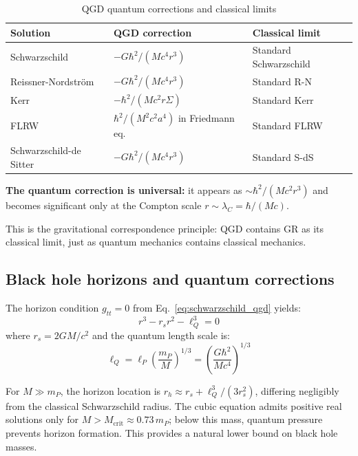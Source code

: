 \documentclass[11pt,a4paper]{article}
\theoremstyle{definition}
\theoremstyle{remark}
\begin{document}
	\begin{table}[ht]
		\centering
		\caption{QGD quantum corrections and classical limits}
		\label{tab:correspondence}
		\begin{tabular}{@{}lll@{}}
			\toprule
			Solution & QGD correction & Classical limit \\
			\midrule
			Schwarzschild & $-G\hbar^2/(Mc^4 r^3)$ & Standard Schwarzschild \\
			Reissner-Nordström & $-G\hbar^2/(Mc^4 r^3)$ & Standard R-N \\
			Kerr & $-\hbar^2/(Mc^2 r\Sigma)$ & Standard Kerr \\
			FLRW & $\hbar^2/(M^2 c^2 a^4)$ in Friedmann eq. & Standard FLRW \\
			Schwarzschild-de Sitter & $-G\hbar^2/(Mc^4 r^3)$ & Standard S-dS \\
			\bottomrule
		\end{tabular}
	\end{table}
	
	\textbf{The quantum correction is universal:} it appears as $\sim \hbar^2/(Mc^2 r^3)$ and becomes significant only at the Compton scale $r \sim \lambda_C = \hbar/(Mc)$.
	
	This is the gravitational correspondence principle: QGD contains GR as its classical limit, just as quantum mechanics contains classical mechanics.
	
	\subsection{Black hole horizons and quantum corrections}
	
	The horizon condition $g_{tt} = 0$ from Eq.~\eqref{eq:schwarzschild_qgd} yields:
	\begin{equation}
		r^3 - r_s r^2 - \ell_Q^3 = 0
		\label{eq:horizon_cubic}
	\end{equation}
	where $r_s = 2GM/c^2$ and the quantum length scale is:
	\begin{equation}
		\ell_Q = \ell_P \left(\frac{m_P}{M}\right)^{1/3} = \left(\frac{G\hbar^2}{Mc^4}\right)^{1/3}
		\label{eq:quantum_length}
	\end{equation}
	
	For $M \gg m_P$, the horizon location is $r_h \approx r_s + \ell_Q^3/(3r_s^2)$, differing negligibly from the classical Schwarzschild radius. The cubic equation admits positive real solutions only for $M > M_{\text{crit}} \approx 0.73\, m_P$; below this mass, quantum pressure prevents horizon formation. This provides a natural lower bound on black hole masses.
	
\end{document}
